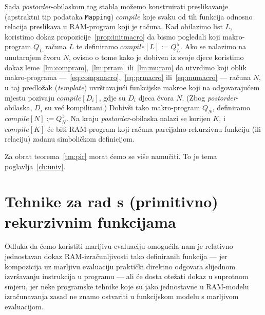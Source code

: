Sada \emph{postorder}-obilaskom tog stabla možemo konstruirati preslikavanje (apstraktni tip podataka \texttt{Mapping}) $compile$ koje svaku od tih funkcija odnosno relacija preslikava u RAM-program koji je računa. Kad obilazimo list $L$, koristimo dokaz propozicije~\ref{prop:initmacro} da bismo pogledali koji makro-program $Q_L$ računa $L$ te definiramo $compile[L]:=Q_L^{\,\flat}$. Ako se nalazimo na unutarnjem čvoru $N$, ovisno o tome kako je dobiven iz svoje djece koristimo dokaz leme~\ref{lm:compram},~\ref{lm:prram} ili~\ref{lm:muram} da utvrdimo koji oblik makro-programa ---~\eqref{eq:compmacro},~\eqref{eq:prmacro} ili~\eqref{eq:mumacro} --- računa $N$, u taj predložak (\emph{template}) uvrštavajući funkcijske makroe koji na odgovarajućem mjestu pozivaju $compile[D_i]$, gdje su $D_i$ djeca čvora $N$. (Zbog \emph{postorder}-obilaska, $D_i$ su već kompilirani.) Dobivši tako makro-program $Q_N$, definiramo $compile[N]:=Q_N^{\,\flat}$. Na kraju \emph{postorder}-obilaska nalazi se korijen $K$, i $compile[K]$ će biti RAM-program koji računa parcijalno rekurzivnu funkciju (ili relaciju) zadanu simboličkom definicijom.

Za obrat teorema~\ref{tm:pir} morat ćemo se više namučiti. To je tema poglavlja~\ref{ch:univ}.

\section{Tehnike za rad s (primitivno) rekurzivnim funkcijama}\label{sec:tech}

Odluka da ćemo koristiti marljivu evaluaciju omogućila nam je relativno jednostavan dokaz RAM-izračunljivosti tako definiranih funkcija --- jer kompozicija uz marljivu evaluaciju praktički direktno odgovara slijednom izvršavanju instrukcija u programu --- ali će dosta otežati dokaz u suprotnom smjeru, jer neke programske tehnike koje su jako jednostavne u RAM-modelu izračunavanja zasad ne znamo ostvariti u funkcijskom modelu s marljivom evaluacijom.

